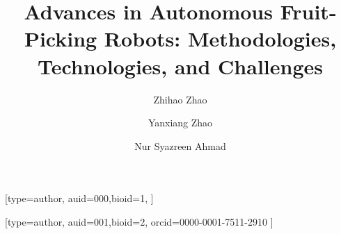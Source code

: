 \documentclass[a4paper,fleqn]{cas-dc}
\begin{document}
\let\ref\Cref 		
\let\eqref\Cref 	
\let\autoref\Cref 	
\let\WriteBookmarks\relax
\def\floatpagepagefraction{1}
\def\textpagefraction{.001}


\title [mode = title]{Advances in Autonomous Fruit-Picking Robots: Methodologies, Technologies, and Challenges}    




\author[1,2]{Zhihao Zhao}[type=author, 
                        auid=000,bioid=1,
                        ]

\address[1]{School of Electrical and Electronic Engineering, Universiti Sains Malaysia, 14300 Nibong Tebal, Penang, Malaysia}

\author[3]{Yanxiang Zhao}
\author[1]{Nur Syazreen Ahmad}[type=author, 
                        auid=001,bioid=2,
                        orcid=0000-0001-7511-2910
                        ]
\cormark[1]

\address[2]{YanTai Engineering and Technology College, 264006 YanTai, Shandong, China}
\address[3]{Central South University, Changsha, Hunan, 410083, China}

\end{document}
